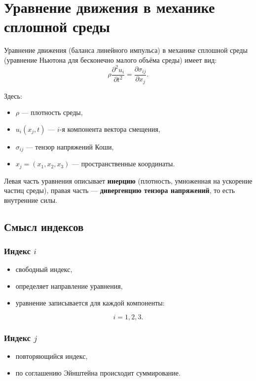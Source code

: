 \section{Уравнение движения в механике сплошной среды}

Уравнение движения (баланса линейного импульса) в механике сплошной среды
(уравнение Ньютона для бесконечно малого объёма среды) имеет вид:
\begin{equation}
\rho \frac{\partial^2 u_i}{\partial t^2}
=
\frac{\partial \sigma_{ij}}{\partial x_j}.
\end{equation}

Здесь:
\begin{itemize}
    \item $\rho$ — плотность среды,
    \item $u_i(x_j,t)$ — $i$-я компонента вектора смещения,
    \item $\sigma_{ij}$ — тензор напряжений Коши,
    \item $x_j = (x_1,x_2,x_3)$ — пространственные координаты.
\end{itemize}

Левая часть уравнения описывает \textbf{инерцию} (плотность, умноженная на ускорение частиц среды),
правая часть — \textbf{дивергенцию тензора напряжений}, то есть внутренние силы.

\subsection{Смысл индексов}

\subsubsection{Индекс $i$}

\begin{itemize}
    \item свободный индекс,
    \item определяет направление уравнения,
    \item уравнение записывается для каждой компоненты:
\end{itemize}
\[
i = 1,2,3.
\]

\subsubsection{Индекс $j$}

\begin{itemize}
    \item повторяющийся индекс,
    \item по соглашению Эйнштейна происходит суммирование.
\end{itemize}

